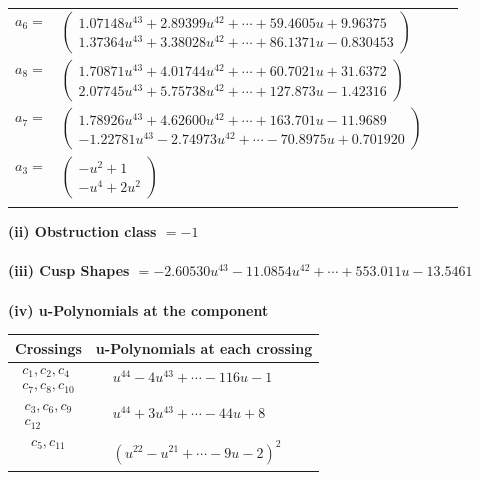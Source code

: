 \documentclass[1p]{elsarticle_modified}
\theoremstyle{definition}
\begin{document}
\begin{tabular}{m{7pt} m{180pt} m{7pt} m{180pt} }
\flushright $a_{6}=$&$\begin{pmatrix}1.07148 u^{43}+2.89399 u^{42}+\cdots+59.4605 u+9.96375\\1.37364 u^{43}+3.38028 u^{42}+\cdots+86.1371 u-0.830453\end{pmatrix}$ \\
\flushright $a_{8}=$&$\begin{pmatrix}1.70871 u^{43}+4.01744 u^{42}+\cdots+60.7021 u+31.6372\\2.07745 u^{43}+5.75738 u^{42}+\cdots+127.873 u-1.42316\end{pmatrix}$ \\
\flushright $a_{7}=$&$\begin{pmatrix}1.78926 u^{43}+4.62600 u^{42}+\cdots+163.701 u-11.9689\\-1.22781 u^{43}-2.74973 u^{42}+\cdots-70.8975 u+0.701920\end{pmatrix}$ \\
\flushright $a_{3}=$&$\begin{pmatrix}- u^2+1\\- u^4+2 u^2\end{pmatrix}$\\&\end{tabular}
\flushleft \textbf{(ii) Obstruction class $= -1$}\\~\\
\flushleft \textbf{(iii) Cusp Shapes $= -2.60530 u^{43}-11.0854 u^{42}+\cdots+553.011 u-13.5461$}\\~\\
\newpage\renewcommand{\arraystretch}{1}
\flushleft \textbf{(iv) u-Polynomials at the component}\newline \\
\begin{tabular}{m{50pt}|m{274pt}}
Crossings & \hspace{64pt}u-Polynomials at each crossing \\
\hline $$\begin{aligned}c_{1},c_{2},c_{4}\\c_{7},c_{8},c_{10}\end{aligned}$$&$\begin{aligned}
&u^{44}-4 u^{43}+\cdots-116 u-1
\end{aligned}$\\
\hline $$\begin{aligned}c_{3},c_{6},c_{9}\\c_{12}\end{aligned}$$&$\begin{aligned}
&u^{44}+3 u^{43}+\cdots-44 u+8
\end{aligned}$\\
\hline $$\begin{aligned}c_{5},c_{11}\end{aligned}$$&$\begin{aligned}
&(u^{22}- u^{21}+\cdots-9 u-2)^{2}
\end{aligned}$\\
\hline
\end{tabular}\\~\\
\end{document}
